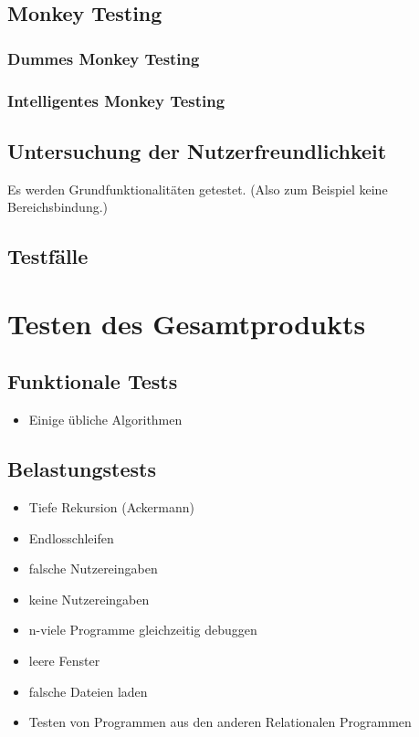 \documentclass[parskip=full]{scrartcl}
\begin{document}
\subsection{Monkey Testing}
\subsubsection{Dummes Monkey Testing}
\subsubsection{Intelligentes Monkey Testing}

\subsection{Untersuchung der Nutzerfreundlichkeit}

Es werden Grundfunktionalitäten getestet. (Also zum Beispiel keine Bereichsbindung.)

\subsection{Testfälle}


\section{Testen des Gesamtprodukts}

\subsection{Funktionale Tests}
\begin{itemize}
\item Einige übliche Algorithmen
\end{itemize}


\subsection{Belastungstests}

\begin{itemize}
\item Tiefe Rekursion (Ackermann)
\item Endlosschleifen
\item falsche Nutzereingaben
\item keine Nutzereingaben
\item n-viele Programme gleichzeitig debuggen
\item leere Fenster
\item falsche Dateien laden
\item Testen von Programmen aus den anderen Relationalen Programmen

\end{itemize}
\end{document}
